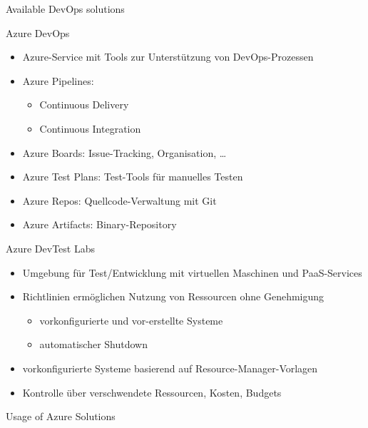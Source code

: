 \begin{flashcard}[Describe]{Available DevOps solutions}

\end{flashcard}

\begin{flashcard}[Describe]{Azure DevOps}
    \begin{itemize}
        \item Azure-Service mit Tools zur Unterstützung von DevOps-Prozessen
        \item Azure Pipelines:
        \begin{itemize}
            \item Continuous Delivery
            \item Continuous Integration
        \end{itemize}
        \item Azure Boards: Issue-Tracking, Organisation, \ldots
        \item Azure Test Plans: Test-Tools für manuelles Testen
        \item Azure Repos: Quellcode-Verwaltung mit Git
        \item Azure Artifacts: Binary-Repository
    \end{itemize}

\end{flashcard}

\begin{flashcard}[Describe]{Azure DevTest Labs}
    \begin{itemize}
        \item Umgebung für Test/Entwicklung mit virtuellen Maschinen und PaaS-Services
        \item Richtlinien ermöglichen Nutzung von Ressourcen ohne Genehmigung
        \begin{itemize}
            \item vorkonfigurierte und vor-erstellte Systeme
            \item automatischer Shutdown
        \end{itemize}
        \item vorkonfigurierte Systeme basierend auf Resource-Manager-Vorlagen
        \item Kontrolle über verschwendete Ressourcen, Kosten, Budgets
    \end{itemize}
\end{flashcard}

\begin{flashcard}{Usage of Azure Solutions}

\end{flashcard}
